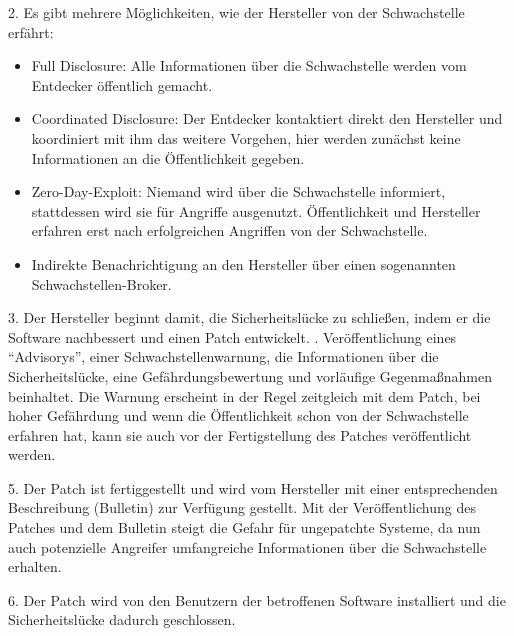 \documentclass[12pt,oneside,a4paper,parskip,pointlessnumbers]{scrbook}
\begin{document}
  2. Es gibt mehrere Möglichkeiten, wie der Hersteller von der Schwachstelle erfährt:
  \begin{itemize}
    \item \glqq Full Disclosure\grqq: Alle Informationen über die Schwachstelle werden vom Entdecker öffentlich gemacht.
    \item \glqq Coordinated Disclosure\grqq: Der Entdecker kontaktiert direkt den Hersteller und koordiniert mit ihm das weitere Vorgehen, hier werden zunächst keine Informationen an die Öffentlichkeit gegeben.
    \item \glqq Zero-Day-Exploit\grqq: Niemand wird über die Schwachstelle informiert, stattdessen wird sie für Angriffe ausgenutzt. Öffentlichkeit und Hersteller erfahren erst nach erfolgreichen Angriffen von der Schwachstelle.
    \item Indirekte Benachrichtigung an den Hersteller über einen sogenannten Schwachstellen-Broker. \end{itemize}
  3. Der Hersteller beginnt damit, die Sicherheitslücke zu schließen, indem er die Software nachbessert und einen Patch entwickelt.
  . Veröffentlichung eines ``Advisorys'', einer Schwachstellenwarnung, die Informationen über die Sicherheitslücke, eine Gefährdungsbewertung und vorläufige Gegenmaßnahmen beinhaltet.
  Die Warnung erscheint in der Regel zeitgleich mit dem Patch, bei hoher Gefährdung und wenn die Öffentlichkeit schon von der Schwachstelle erfahren hat, kann sie auch vor der Fertigstellung des Patches veröffentlicht werden.

  5. Der Patch ist fertiggestellt und wird vom Hersteller mit einer entsprechenden Beschreibung (Bulletin) zur Verfügung gestellt. Mit der Veröffentlichung des Patches und dem Bulletin steigt die Gefahr für ungepatchte Systeme, da nun auch potenzielle Angreifer umfangreiche Informationen über die Schwachstelle
  erhalten.

  6. Der Patch wird von den Benutzern der betroffenen Software installiert und die Sicherheitslücke dadurch geschlossen.
\end{document}
